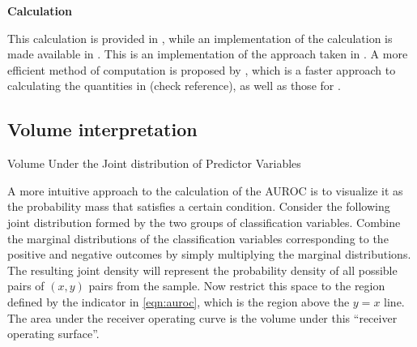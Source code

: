 %
%
%




\textbf{Calculation}

This calculation is provided in \citet{hanleymcneil1982}, while an implementation of the calculation is made available in \citet{proc2011}.
This is an implementation of the approach taken in \citet{delong1988}. 
% 
A more efficient method of computation is proposed by \citet{sunxu2014}, which is a faster approach to calculating the quantities in \citet{hanleymcneil1982} (check reference), as well as those for \citet{delong1988}.
% 

\subsection{Volume interpretation}

Volume Under the Joint distribution of Predictor Variables

A more intuitive approach to the calculation of the AUROC is to visualize it as the probability mass that satisfies a certain condition. 
Consider the following joint distribution formed by the two groups of classification variables. 
Combine the marginal distributions of the classification variables corresponding to the positive and negative outcomes by simply multiplying the marginal distributions. 
The resulting joint density will represent the probability density of all possible pairs of $(x,y)$ pairs from the sample. 
Now restrict this space to the region defined by the indicator in \ref{eqn:auroc}, which is the region above the $y = x$ line. 
The area under the receiver operating curve is the volume under this ``receiver operating surface''. 

